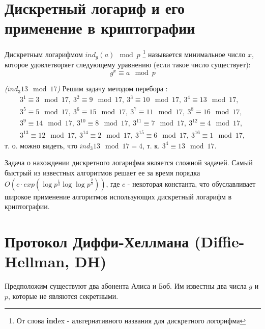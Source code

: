 \section{Дискретный логариф и его применение в криптографии}
\label{AddDiscretLog}
\begin{definition}
Дискретным логарифмом $ind_g\left(a\right) \mod{p}$
\footnote{От слова {\bf ind}ex - альтернативного названия для дискретного логорифма}
называется
минимальное число $x$, которое удовлетворяет следующему уравнению
(если такое число существует): 
\begin{equation}
g^x \equiv a \mod{p}
\nonumber
\end{equation}
\end{definition}

\begin{example}
\emph{($ind_3{13} \mod{17}$)}
Решим задачу методом перебора \cite{bWikiDiscretLog}:
\begin{eqnarray}
3^1 \equiv 3 \mod{17},\: 
3^2 \equiv 9 \mod{17},\: 
3^3 \equiv 10 \mod{17},\:
3^4 \equiv 13 \mod{17}, 
\nonumber \\
3^5 \equiv 5 \mod{17},\: 
3^6 \equiv 15 \mod{17},\: 
3^7 \equiv 11 \mod{17},\: 
3^8 \equiv 16 \mod{17}, 
\nonumber \\
3^9 \equiv 14 \mod{17},\: 
3^{10} \equiv 8 \mod{17},\: 
3^{11} \equiv 7 \mod{17},\: 
3^{12} \equiv 4 \mod{17}, 
\nonumber \\
3^{13} \equiv 12 \mod{17},\: 
3^{14} \equiv 2 \mod{17},\:
3^{15} \equiv 6 \mod{17},\: 
3^{16} \equiv 1 \mod{17},
\nonumber
\end{eqnarray}
т. о. можно видеть, что $ind_3{13} \mod{17} = 4$, 
т. к. $3^4 \equiv 13 \mod{17}$. 
\nonumber
\end{example}

Задача о нахождении дискретного логарифма является сложной
задачей. Самый быстрый из известных алгоритмов
\cite{bGordon93discretelogarithms} решает ее за время порядка 
\(
O\left(c \cdot
exp\left(\log{p}^{\frac{1}{3}}\log{\log{p}}^{\frac{2}{3}}
\right)\right)
\), где $c$ - некоторая константа,
что обуславливает широкое применение алгоритмов использующих
дискретный логарифм в криптографии.

\section{Протокол Диффи-Хеллмана (Diffie-Hellman, DH)}
Предположим существуют два абонента Алиса и Боб. Им известны два числа
$g$ и $p$, которые не являются секретными.

